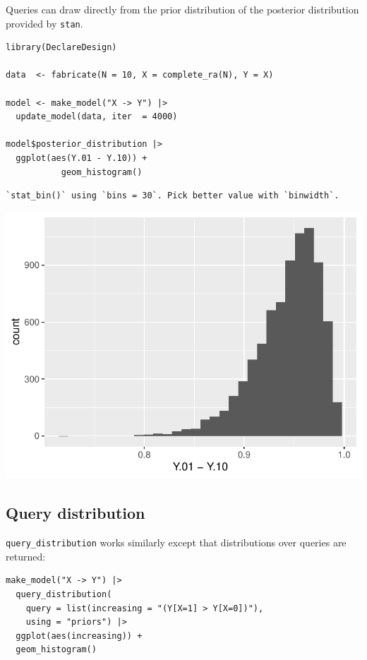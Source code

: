 \documentclass[
  article]{jss}
\begin{document}
Queries can draw directly from the prior distribution of the posterior
distribution provided by \texttt{stan}.

\begin{verbatim}
library(DeclareDesign)

data  <- fabricate(N = 10, X = complete_ra(N), Y = X)

model <- make_model("X -> Y") |>
  update_model(data, iter  = 4000)

model$posterior_distribution |> 
  ggplot(aes(Y.01 - Y.10)) + 
           geom_histogram()
\end{verbatim}

\begin{verbatim}
`stat_bin()` using `bins = 30`. Pick better value with `binwidth`.
\end{verbatim}

\includegraphics{paper_files/figure-pdf/unnamed-chunk-92-1.pdf}

\hypertarget{query-distribution}{%
\subsection{Query distribution}\label{query-distribution}}

\texttt{query\_distribution} works similarly except that distributions
over queries are returned:

\begin{verbatim}
make_model("X -> Y") |> 
  query_distribution(
    query = list(increasing = "(Y[X=1] > Y[X=0])"), 
    using = "priors") |>
  ggplot(aes(increasing)) +
  geom_histogram()
\end{verbatim}
\end{document}
